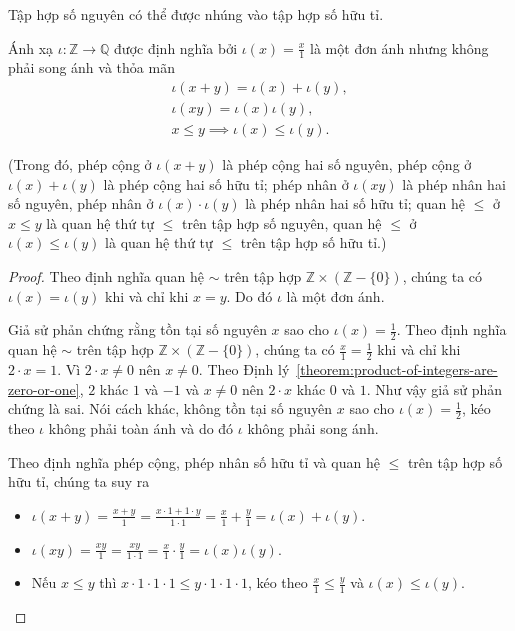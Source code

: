 Tập hợp số nguyên có thể được nhúng vào tập hợp số hữu tỉ.
\begin{theorem}\label{theorem:embed-Z-into-Q}
	Ánh xạ $\iota: \mathbb{Z}\to \mathbb{Q}$ được định nghĩa bởi $\iota(x) = \frac{x}{1}$ là một đơn ánh nhưng không phải song ánh và thỏa mãn
	\[
		\begin{split}
			\iota(x + y) = \iota(x) + \iota(y), \\
			\iota(xy) = \iota(x)\iota(y), \\
			x\leq y \implies \iota(x)\leq \iota(y).
		\end{split}
	\]

	(Trong đó, phép cộng ở $\iota(x + y)$ là phép cộng hai số nguyên, phép cộng ở $\iota(x) + \iota(y)$ là phép cộng hai số hữu tỉ; phép nhân ở $\iota(xy)$ là phép nhân hai số nguyên, phép nhân ở $\iota(x)\cdot\iota(y)$ là phép nhân hai số hữu tỉ; quan hệ $\leq$ ở $x\leq y$ là quan hệ thứ tự $\leq$ trên tập hợp số nguyên, quan hệ $\leq$ ở $\iota(x)\leq \iota(y)$ là quan hệ thứ tự $\leq$ trên tập hợp số hữu tỉ.)
\end{theorem}

\begin{proof}
	Theo định nghĩa quan hệ $\sim$ trên tập hợp $\mathbb{Z}\times (\mathbb{Z} - \{0\})$, chúng ta có $\iota(x) = \iota(y)$ khi và chỉ khi $x = y$. Do đó $\iota$ là một đơn ánh.

	Giả sử phản chứng rằng tồn tại số nguyên $x$ sao cho $\iota(x) = \frac{1}{2}$. Theo định nghĩa quan hệ $\sim$ trên tập hợp $\mathbb{Z}\times (\mathbb{Z} - \{0\})$, chúng ta có $\frac{x}{1} = \frac{1}{2}$ khi và chỉ khi $2\cdot x = 1$. Vì $2\cdot x\ne 0$ nên $x\ne 0$. Theo Định lý~\ref{theorem:product-of-integers-are-zero-or-one}, $2$ khác $1$ và $-1$ và $x\ne 0$ nên $2\cdot x$ khác $0$ và $1$. Như vậy giả sử phản chứng là sai. Nói cách khác, không tồn tại số nguyên $x$ sao cho $\iota(x) = \frac{1}{2}$, kéo theo $\iota$ không phải toàn ánh và do đó $\iota$ không phải song ánh.

	Theo định nghĩa phép cộng, phép nhân số hữu tỉ và quan hệ $\leq$ trên tập hợp số hữu tỉ, chúng ta suy ra
	\begin{itemize}
		\item $\iota(x + y) = \frac{x + y}{1} = \frac{x\cdot 1 + 1\cdot y}{1\cdot 1} = \frac{x}{1} + \frac{y}{1} = \iota(x) + \iota(y)$.
		\item $\iota(xy) = \frac{xy}{1} = \frac{xy}{1\cdot 1} = \frac{x}{1}\cdot\frac{y}{1} = \iota(x)\iota(y)$.
		\item Nếu $x\leq y$ thì $x\cdot 1\cdot 1\cdot 1\leq y\cdot 1\cdot 1\cdot 1$, kéo theo $\frac{x}{1}\leq \frac{y}{1}$ và $\iota(x)\leq \iota(y)$.
	\end{itemize}
\end{proof}

